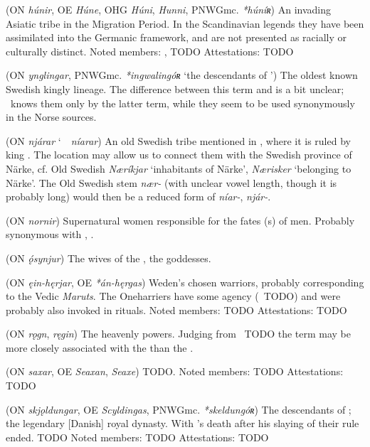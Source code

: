 \begin{itemize}
 (ON \emph{húnir}, OE \emph{Húne}, OHG \emph{Húni}, \emph{Hunni}, PNWGmc. \emph{*húníʀ})
  An invading Asiatic tribe in the Migration Period. In the Scandinavian legends they have been assimilated into the Germanic framework, and are not presented as racially or culturally distinct.
  Noted members: , TODO
  Attestations: TODO

 (ON \emph{ynglingar}, PNWGmc. \emph{*ingwalingóʀ} ‘the descendants of ’)
  The oldest known Swedish kingly lineage. The difference between this term and  is a bit unclear; \Beowulf\ knows them only by the latter term, while they seem to be used synonymously in the Norse sources.

 (ON \emph{njárar} \char`~\ \emph{níarar})
  An old Swedish tribe mentioned in \Volundarkvida, where it is ruled by king .  The location may allow us to connect them with the Swedish province of Närke, cf. Old Swedish \emph{Næríkjar} ‘inhabitants of Närke’, \emph{Nærisker} ‘belonging to Närke’.  The Old Swedish stem \emph{nær-} (with unclear vowel length, though it is probably long) would then be a reduced form of \emph{níar-}, \emph{njár-}.

 (ON \emph{nornir})
  Supernatural women responsible for the fates (s) of men.  Probably synonymous with , .

 (ON \emph{ǫ́synjur})
  The wives of the , the goddesses.

 (ON \emph{ęin-hęrjar}, OE \emph{*án-hęrgas})
  Weden’s chosen warriors, probably corresponding to the Vedic \emph{Maruts}.  The Oneharriers have some agency (\Grimnismal\ TODO) and were probably also invoked in rituals.
  Noted members: TODO
  Attestations: TODO

 (ON \emph{rǫgn}, \emph{ręgin})
  The heavenly powers.  Judging from \Vafthrudnismal\ TODO the term may be more closely associated with the  than the .

 (ON \emph{saxar}, OE \emph{Seaxan}, \emph{Seaxe})
  TODO.
  Noted members: TODO
  Attestations: TODO

 (ON \emph{skjǫldungar}, OE \emph{Scyldingas}, PNWGmc. \emph{*skeldungóʀ})
  The descendants of ; the legendary [Danish] royal dynasty. With ’s death after his slaying of  their rule ended. TODO
  Noted members: TODO
  Attestations: TODO


\end{itemize}
